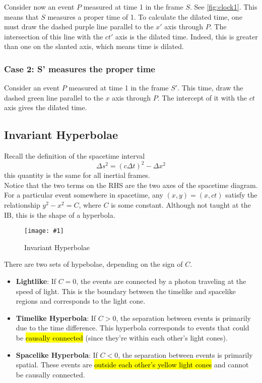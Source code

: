 \documentclass[a4paper,12pt]{article}
\newcommand{\lb}{\\[8pt]}
\newcommand{\img}[4]{\begin{center}
  \begin{figure}[H]
    \centering
    \texttt{[image: \#1]}
    \caption{#3}
    \label{fig:#4}
  \end{figure}
\end{center}}
\begin{document}
Consider now an event $P$ measured at time 1 in the frame $S$. See \cref{fig:clock1}. This means that $S$ measures a proper time of 1. To calculate the dilated time, one must draw the dashed purple line parallel to the $x'$ axis through $P$. The intersection of this line with the $ct'$ axis is the dilated time. Indeed, this is greater than one on the slanted axis, which means time is dilated.

\subsubsection*{Case 2: S' measures the proper time}

Consider an event $P$ measured at time 1 in the frame $S'$. This time, draw the dashed green line parallel to the $x$ axis through $P$. The intercept of it with the $ct$ axis gives the dilated time.

\pagebreak

\subsection{Invariant Hyperbolae}

Recall the definition of the spacetime interval
$$
  \Delta s^2 = (c\Delta t)^2 - \Delta x^2
$$
this quantity is the same for all inertial frames.\lb
Notice that the two terms on the RHS are the two axes of the spacetime diagram. For a particular event somewhere in spacetime, any $(x, y) = (x, ct)$ satisfy the relationship $y^2 - x^2 = C$, where $C$ is some constant. Although not taught at the IB, this is the shape of a hyperbola.
\img{hyperbolae.png}{0.7}{Invariant Hyperbolae}{hyperbolae}
There are two sets of hypebolae, depending on the sign of $C$.
\begin{itemize}
  \item \textbf{Lightlike}: If $C = 0$, the events are connected by a photon traveling at the speed of light. This is the boundary between the timelike and spacelike regions and corresponds to the light cone.
  \item \textbf{Timelike Hyperbola}: If $C > 0$, the separation between events is primarily due to the time difference. This hyperbola corresponds to events that could be \hl{causally connected} (since they're within each other's light cones).
  \item \textbf{Spacelike Hyperbola}: If $C < 0$, the separation between events is primarily spatial. These events are \hl{outside each other's yellow light cones} and cannot be causally connected.
\end{itemize}
\end{document}

